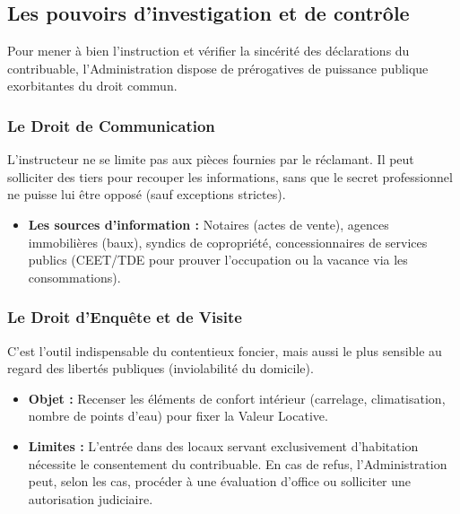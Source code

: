 \documentclass[Cours_contentieuxTF2026.tex]{subfiles}
\begin{document}
\subsection{Les pouvoirs d'investigation et de contrôle}

Pour mener à bien l'instruction et vérifier la sincérité des déclarations du contribuable, l'Administration dispose de prérogatives de puissance publique exorbitantes du droit commun.

\subsubsection{Le Droit de Communication}
L'instructeur ne se limite pas aux pièces fournies par le réclamant. Il peut solliciter des tiers pour recouper les informations, sans que le secret professionnel ne puisse lui être opposé (sauf exceptions strictes).
\begin{itemize}
	\item \textbf{Les sources d'information :} Notaires (actes de vente), agences immobilières (baux), syndics de copropriété, concessionnaires de services publics (CEET/TDE pour prouver l'occupation ou la vacance via les consommations).
\end{itemize}

\subsubsection{Le Droit d'Enquête et de Visite}
C'est l'outil indispensable du contentieux foncier, mais aussi le plus sensible au regard des libertés publiques (inviolabilité du domicile).
\begin{itemize}
	\item \textbf{Objet :} Recenser les éléments de confort intérieur (carrelage, climatisation, nombre de points d'eau) pour fixer la Valeur Locative.
	\item \textbf{Limites :} L'entrée dans des locaux servant exclusivement d'habitation nécessite le consentement du contribuable. En cas de refus, l'Administration peut, selon les cas, procéder à une évaluation d'office ou solliciter une autorisation judiciaire.
\end{itemize}

\vspace{0.5cm}

\begin{center}
\end{center}
\end{document}
